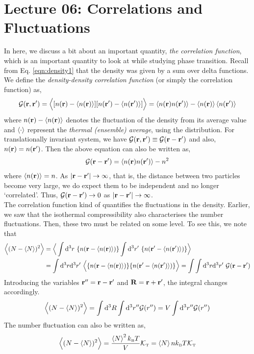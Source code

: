 \label{lec06}
\section*{Lecture 06: Correlations and Fluctuations}
In here, we discuss a bit about an important quantity, \textit{the correlation function}, which is an important quantity to look at while studying phase transition. Recall from Eq. \eqref{eqn:density1} that the density was given by a sum over delta functions. We define the \textit{density-density correlation function} (or simply the correlation function) as,
$$\mathcal G(\vb{r},\vb{r}') = \Big\langle [n(\vb{r})-\left\langle n(\vb{r}) \right\rangle][n(\vb{r}')-\left\langle n(\vb{r}') \right\rangle]\Big\rangle = \left\langle n(\vb{r})n(\vb{r}') \right\rangle -\left\langle n(\vb{r}) \right\rangle\left\langle n(\vb{r}') \right\rangle$$
where $n(\vb{r})-\left\langle n(\vb{r}) \right\rangle$ denotes the fluctuation of the density from its average value and $\left\langle \cdot \right\rangle$ represent the \textit{thermal (ensemble) average}, using the distribution. For translationally invariant system, we have $\mathcal G(\vb{r}, \vb{r}') \equiv \mathcal G(\vb{r}-\vb{r}')$ and also, $n(\vb{r})=n(\vb{r}')$. Then the above equation can also be written as,
$$\mathcal G(\vb{r}-\vb{r}') = \left\langle n(\vb{r})n(\vb{r}') \right\rangle-n^2$$
where $\left\langle n(\vb{r}) \right\rangle=n$. As $\abs{\vb{r}-\vb{r}'}\to \infty$, that is, the distance between two particles become very large, we do expect them to be independent and no longer `correlated'. Thus, $\mathcal G(\vb{r}-\vb{r}')\to 0$ as $\abs{\vb{r}-\vb{r}'}\to \infty$.\\[0.2cm]
The correlation function kind of quantifies the fluctuations in the density. Earlier, we saw that the isothermal compressibility also characterises the number fluctuations. Then, these two must be related on some level. To see this, we note that 
\begin{align*}
    \Big\langle (N-\avg{N})^2 \Big\rangle &= \Big\langle \int \dd^3r\ \qty{n(\vb{r}-\avg{n(\vb{r})})}\int \dd^3r'\ \qty{n(\vb{r}'-\avg{n(\vb{r}')})} \Big\rangle\\
    &= \int \dd^3r\dd^3r'\ \Big\langle\qty{n(\vb{r}-\avg{n(\vb{r})})}\qty{n(\vb{r}'-\avg{n(\vb{r}')})} \Big\rangle = \int  \int \dd^3r\dd^3r'\ \SG(\vb{r}-\vb{r}')
\end{align*}
Introducing the variables $\vb{r}'' = \vb{r}-\vb{r}'$ and $\vb{R}= \vb{r}+\vb{r}'$, the integral changes accordingly.
$$\Big\langle (N-\left\langle N \right\rangle)^2 \Big\rangle = \int \dd^3 R \int \dd^3 r'' \mathcal G(r'')  = V\int \dd^3r'' \mathcal G(r'')$$
The number fluctuation can also be written as,
$$\Big\langle (N-\left\langle N \right\rangle)^2 \Big\rangle = \frac{\left\langle N \right\rangle^2k_{\text{\tiny B}} T}{V}\mathcal K_{\text{\tiny T}} = \left\langle N \right\rangle nk_{\text{\tiny B}} T \mathcal K_{\text{\tiny T}}$$
